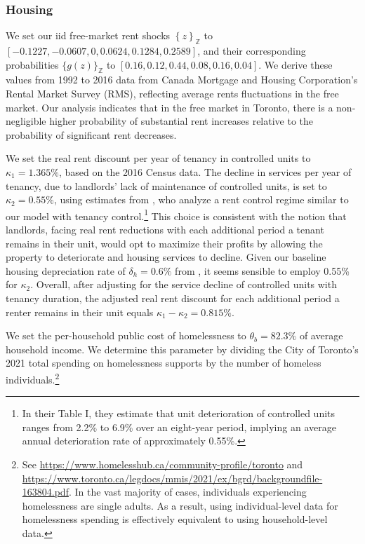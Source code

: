 \documentclass[parskip=full]{article}
\begin{document}
\subsubsection{Housing}

We set our iid free-market rent shocks $\left\{z\right\}_{\mathbb{Z}}$ to $\left[-0.1227,-0.0607,0,0.0624,0.1284,0.2589\right]$, and their corresponding probabilities $\{g(z)\}_{\mathbb{Z}}$ to $\left[0.16,0.12,0.44,0.08,0.16,0.04\right]$. We derive these values from 1992 to 2016 data from Canada Mortgage and Housing Corporation's Rental Market Survey (RMS), reflecting average rents fluctuations in the free market. Our analysis indicates that in the free market in Toronto, there is a non-negligible higher probability of substantial rent increases relative to the probability of significant rent decreases.

We set the real rent discount per year of tenancy in controlled units to $\kappa_{1}=1.365\%$, based on the 2016 Census data. The decline in services per year of tenancy, due to landlords' lack of maintenance of controlled units, is set to $\kappa_{2}=0.55\%$, using estimates from \citet{murray_et_al-1991}, who analyze a rent control regime similar to our model with tenancy control.\footnote{In their Table I, they estimate that unit deterioration of controlled units ranges from 2.2\% to 6.9\% over an eight-year period, implying an average annual deterioration rate of approximately 0.55\%.} This choice is consistent with the notion that landlords, facing real rent reductions with each additional period a tenant remains in their unit, would opt to maximize their profits by allowing the property to deteriorate and housing services to decline. Given our baseline housing depreciation rate of $\delta_{h}=0.6\%$ from \citet{rosenthal-2014}, it seems sensible to employ 0.55\% for $\kappa_{2}$. Overall, after adjusting for the service decline of controlled units with tenancy duration, the adjusted real rent discount for each additional period a renter remains in their unit equals $\kappa_1-\kappa_2=0.815\%$. 

We set the per-household public cost of homelessness to $\theta_{b}=82.3\%$ of average household income. We determine this parameter by dividing the City of Toronto's 2021 total spending on homelessness supports by the number of homeless individuals.\footnote{See \url{https://www.homelesshub.ca/community-profile/toronto} and \url{https://www.toronto.ca/legdocs/mmis/2021/ex/bgrd/backgroundfile-163804.pdf}. In the vast majority of cases, individuals experiencing homelessness are single adults. As a result, using individual-level data for homelessness spending is effectively equivalent to using household-level data.}
\end{document}
